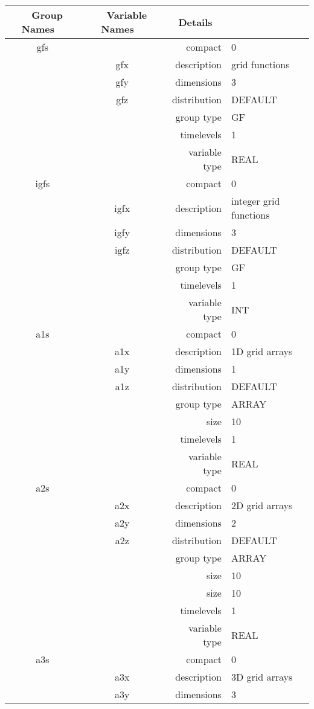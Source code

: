 \begin{tabular*}{150mm}{|c|c@{\extracolsep{\fill}}|rl|} \hline 
~ {\bf Group Names} ~ & ~ {\bf Variable Names} ~  &{\bf Details} ~ & ~\\ 
\hline 
gfs &  & compact & 0 \\ 
 & gfx & description & grid functions \\ 
 & gfy & dimensions & 3 \\ 
 & gfz & distribution & DEFAULT \\ 
 &  & group type & GF \\ 
 &  & timelevels & 1 \\ 
 &  & variable type & REAL \\ 
\hline 
igfs &  & compact & 0 \\ 
 & igfx & description & integer grid functions \\ 
 & igfy & dimensions & 3 \\ 
 & igfz & distribution & DEFAULT \\ 
 &  & group type & GF \\ 
 &  & timelevels & 1 \\ 
 &  & variable type & INT \\ 
\hline 
a1s &  & compact & 0 \\ 
 & a1x & description & 1D grid arrays \\ 
 & a1y & dimensions & 1 \\ 
 & a1z & distribution & DEFAULT \\ 
 &  & group type & ARRAY \\ 
 &  & size & 10 \\ 
 &  & timelevels & 1 \\ 
 &  & variable type & REAL \\ 
\hline 
a2s &  & compact & 0 \\ 
 & a2x & description & 2D grid arrays \\ 
 & a2y & dimensions & 2 \\ 
 & a2z & distribution & DEFAULT \\ 
 &  & group type & ARRAY \\ 
 &  & size & 10 \\ 
& ~ & size & 10 \\ 
 &  & timelevels & 1 \\ 
 &  & variable type & REAL \\ 
\hline 
a3s &  & compact & 0 \\ 
 & a3x & description & 3D grid arrays \\ 
 & a3y & dimensions & 3 \\ 

\end{tabular*}
